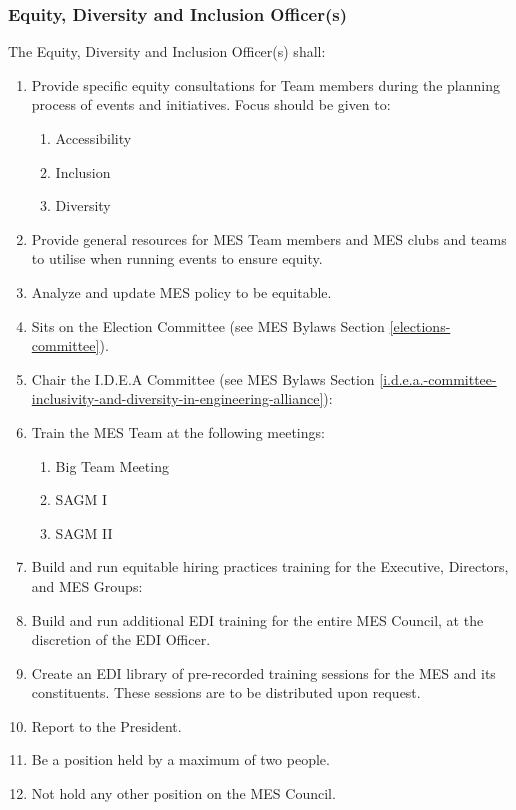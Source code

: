 \subsubsection{Equity, Diversity and Inclusion Officer(s)}
\label{equity-diversity-and-inclusion-officers}
The Equity, Diversity and Inclusion Officer(s) shall:

\begin{enumerate}
 \item
  Provide specific equity consultations for Team members during the planning process of events and initiatives. Focus should be given to:

  \begin{enumerate}
   \item
    Accessibility
   \item
    Inclusion
   \item
    Diversity
  \end{enumerate}
 \item
  Provide general resources for MES Team members and MES clubs and teams to utilise when running events to ensure equity.
 \item
  Analyze and update MES policy to be equitable.
 \item
  Sits on the Election Committee (see MES Bylaws Section \ref{elections-committee}).
 \item
  Chair the I.D.E.A Committee (see MES Bylaws Section \ref{i.d.e.a.-committee-inclusivity-and-diversity-in-engineering-alliance}):
 \item
  Train the MES Team at the following meetings:

  \begin{enumerate}
   \item
    Big Team Meeting
   \item
    SAGM I
   \item
    SAGM II
  \end{enumerate}
 \item
  Build and run equitable hiring practices training for the Executive, Directors, and MES Groups:
 \item
  Build and run additional EDI training for the entire MES Council, at the discretion of the EDI Officer.
 \item
  Create an EDI library of pre-recorded training sessions for the MES and its constituents. These sessions are to be distributed upon request.
 \item
  Report to the President.
 \item
  Be a position held by a maximum of two people.
 \item
  Not hold any other position on the MES Council.

\end{enumerate}